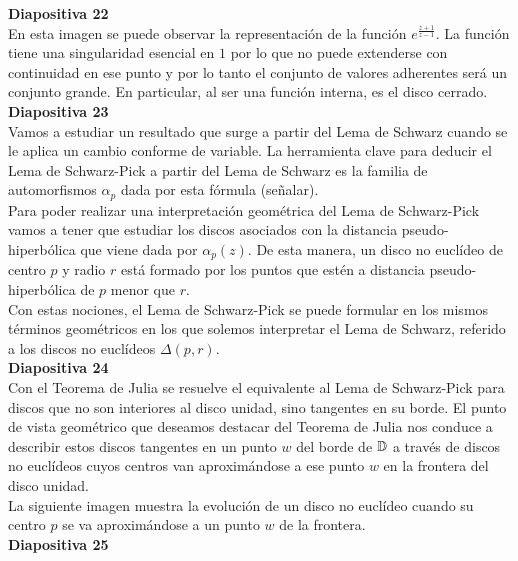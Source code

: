 \documentclass[spanish, a4paper, 12pt]{article}
\begin{document}
\textbf{Diapositiva 22} \\

En esta imagen se puede observar la representación de la función $e^{\frac{z+1}{z-1}}$. La función tiene una singularidad esencial en $1$ por lo que no puede extenderse con continuidad en ese punto y por lo tanto el conjunto de valores adherentes será un conjunto grande. En particular, al ser una función interna, es el disco cerrado. \\

\textbf{Diapositiva 23} \\

Vamos a estudiar un resultado que surge a partir del Lema de Schwarz cuando se le aplica un cambio conforme de variable. La herramienta clave para deducir el Lema de Schwarz-Pick a partir del Lema de Schwarz es la familia de automorfismos $\alpha_p$ dada por esta fórmula (señalar). \\

Para poder realizar una interpretación geométrica del Lema de Schwarz-Pick vamos a tener que estudiar los discos asociados con la distancia pseudo-hiperbólica que viene dada por $\alpha_p(z)$. De esta manera, un disco no euclídeo de centro $p$ y radio $r$ está formado por los puntos que estén a distancia pseudo-hiperbólica de $p$ menor que $r$. \\

Con estas nociones, el Lema de Schwarz-Pick se puede formular en los mismos términos geométricos en los que solemos interpretar el Lema de Schwarz, referido a los discos no euclídeos $\Delta(p,r)$. \\

\textbf{Diapositiva 24} \\

Con el Teorema de Julia se resuelve el equivalente al Lema de Schwarz-Pick para discos que no son interiores al disco unidad, sino tangentes en su borde. El punto de vista geométrico que deseamos destacar del Teorema de Julia nos conduce a describir estos discos tangentes en un punto $w$ del borde de $\mathbb{D}$ a través de discos no euclídeos cuyos centros van aproximándose a ese punto $w$ en la frontera del disco unidad. \\

La siguiente imagen muestra la evolución de un disco no euclídeo cuando su centro $p$ se va aproximándose a un punto $w$ de la frontera. \\

\textbf{Diapositiva 25} \\
\end{document}
